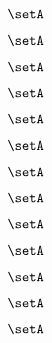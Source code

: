 \begin{forslides}
    \begin{equation}
        \label{eq:slides-processes-119}
        \setA
    \end{equation}

    \begin{equation}
        \label{eq:slides-processes-120}
        \setA
    \end{equation}

    \begin{equation}
        \label{eq:slides-processes-121}
        \setA
    \end{equation}

    \begin{equation}
        \label{eq:slides-processes-122}
        \setA
    \end{equation}

    \begin{equation}
        \label{eq:slides-processes-123}
        \setA
    \end{equation}

    \begin{equation}
        \label{eq:slides-processes-124}
        \setA
    \end{equation}

    \begin{equation}
        \label{eq:slides-processes-125}
        \setA
    \end{equation}

    \begin{equation}
        \label{eq:slides-processes-126}
        \setA
    \end{equation}

    \begin{equation}
        \label{eq:slides-processes-127}
        \setA
    \end{equation}

    \begin{equation}
        \label{eq:slides-processes-128}
        \setA
    \end{equation}

    \begin{equation}
        \label{eq:slides-processes-129}
        \setA
    \end{equation}

    \begin{equation}
        \label{eq:slides-processes-130}
        \setA
    \end{equation}

    \begin{equation}
        \label{eq:slides-processes-131}
        \setA
    \end{equation}


\end{forslides}
